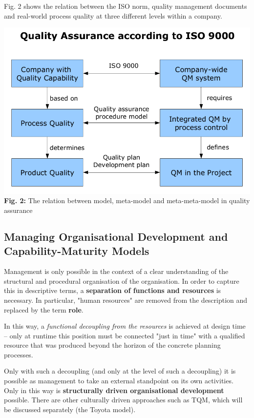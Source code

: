 \documentclass[11pt,a4paper]{article}
\begin{document}
Fig. 2 shows the relation between the ISO norm, quality management documents
and real-world process quality at three different levels within a company.  

\begin{center}
  \includegraphics[width=.8\textwidth]{1.png}\\ \textbf{Fig. 2:} The relation
  between model, meta-model and meta-meta-model in quality assurance
\end{center}

\subsection{Managing Organisational Development and\\ Capability-Maturity
  Models} 

Management is only possible in the context of a clear understanding of the
structural and procedural organisation of the organisation.  In order to
capture this in descriptive terms, a \textbf{separation of functions and
  resources} is necessary. In particular, "human resources" are removed from
the description and replaced by the term \textbf{role}.

In this way, a \emph{functional decoupling from the resources} is achieved at
design time -- only at runtime this position must be connected "just in time"
with a qualified resource that was produced beyond the horizon of the concrete
planning processes.

Only with such a decoupling (and only at the level of such a decoupling) it is
possible as management to take an external standpoint on its own activities.
Only in this way is \textbf{structurally driven organisational development}
possible. There are other culturally driven approaches such as TQM, which will
be discussed separately (the Toyota model).
\end{document}
